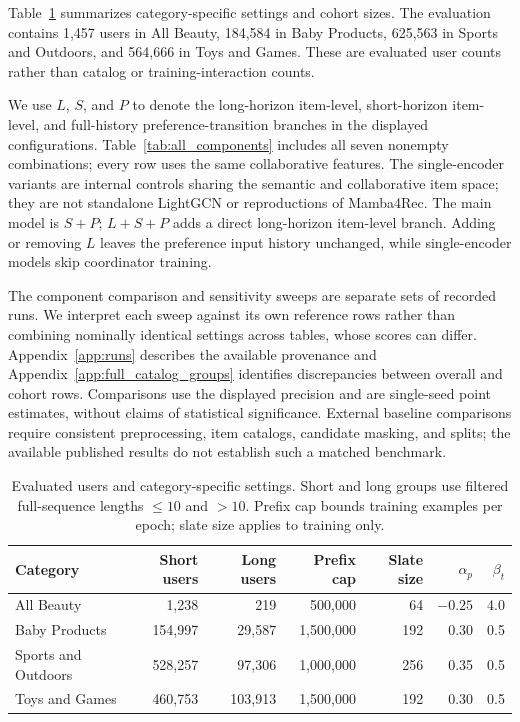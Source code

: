 \documentclass[11pt]{article}
\begin{document}
Table~\ref{tab:config} summarizes category-specific settings and cohort sizes. The evaluation contains 1,457 users in All Beauty, 184,584 in Baby Products, 625,563 in Sports and Outdoors, and 564,666 in Toys and Games. These are evaluated user counts rather than catalog or training-interaction counts.

We use $L$, $S$, and $P$ to denote the long-horizon item-level, short-horizon item-level, and full-history preference-transition branches in the displayed configurations. Table~\ref{tab:all_components} includes all seven nonempty combinations; every row uses the same collaborative features. The single-encoder variants are internal controls sharing the semantic and collaborative item space; they are not standalone LightGCN or reproductions of Mamba4Rec. The main model is $S+P$; $L+S+P$ adds a direct long-horizon item-level branch. Adding or removing $L$ leaves the preference input history unchanged, while single-encoder models skip coordinator training.

The component comparison and sensitivity sweeps are separate sets of recorded runs. We interpret each sweep against its own reference rows rather than combining nominally identical settings across tables, whose scores can differ. Appendix~\ref{app:runs} describes the available provenance and Appendix~\ref{app:full_catalog_groups} identifies discrepancies between overall and cohort rows. Comparisons use the displayed precision and are single-seed point estimates, without claims of statistical significance. External baseline comparisons require consistent preprocessing, item catalogs, candidate masking, and splits; the available published results do not establish such a matched benchmark.

\begin{table}[!t]
\centering
\begin{tabular}{lrrrrrr}
\toprule
Category & Short users & Long users & Prefix cap & Slate size & $\alpha_p$ & $\beta_t$\\
\midrule
All Beauty & 1,238 & 219 & 500,000 & 64 & $-0.25$ & 4.0\\
Baby Products & 154,997 & 29,587 & 1,500,000 & 192 & 0.30 & 0.5\\
Sports and Outdoors & 528,257 & 97,306 & 1,000,000 & 256 & 0.35 & 0.5\\
Toys and Games & 460,753 & 103,913 & 1,500,000 & 192 & 0.30 & 0.5\\
\bottomrule
\end{tabular}
\caption{Evaluated users and category-specific settings. Short and long groups use filtered full-sequence lengths $\leq10$ and $>10$. Prefix cap bounds training examples per epoch; slate size applies to training only.}
\label{tab:config}
\end{table}
\end{document}

